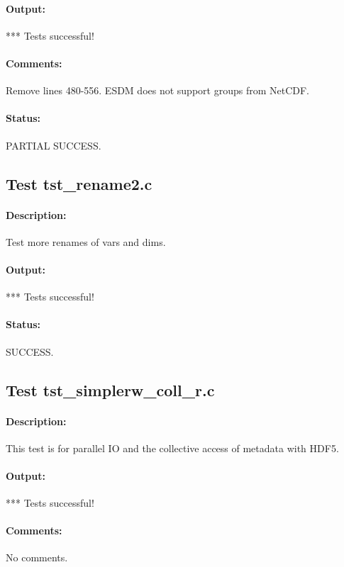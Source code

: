 \paragraph{Output:} *** Tests successful!

\paragraph{Comments:} Remove lines 480-556. ESDM does not support groups from NetCDF.

\paragraph{Status:} PARTIAL SUCCESS.

\subsection{Test tst\_rename2.c}

\paragraph{Description:} Test more renames of vars and dims.

\paragraph{Output:} *** Tests successful!

\paragraph{Status:} SUCCESS.

\subsection{Test tst\_simplerw\_coll\_r.c}

\paragraph{Description:} This test is for parallel IO and the collective access of metadata with HDF5.

\paragraph{Output:} *** Tests successful!

\paragraph{Comments:} No comments.

